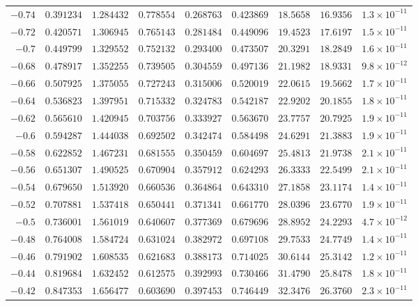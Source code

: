 \documentclass[12pt]{extarticle}
\theoremstyle{plain}
\theoremstyle{remark}
\begin{document}
{\begin{longtable}{rcccccccc}
$-0.74$ & $0.391234$ & $1.284432$ & $0.778554$ & $0.268763$ & $0.423869$ & $18.5658$ & $16.9356$ & $1.3\times10^{-11}$ \\
$-0.72$ & $0.420571$ & $1.306945$ & $0.765143$ & $0.281484$ & $0.449096$ & $19.4523$ & $17.6197$ & $1.5\times10^{-11}$ \\
$-0.7$ & $0.449799$ & $1.329552$ & $0.752132$ & $0.293400$ & $0.473507$ & $20.3291$ & $18.2849$ & $1.6\times10^{-11}$ \\
$-0.68$ & $0.478917$ & $1.352255$ & $0.739505$ & $0.304559$ & $0.497136$ & $21.1982$ & $18.9331$ & $9.8\times10^{-12}$ \\
$-0.66$ & $0.507925$ & $1.375055$ & $0.727243$ & $0.315006$ & $0.520019$ & $22.0615$ & $19.5662$ & $1.7\times10^{-11}$ \\
$-0.64$ & $0.536823$ & $1.397951$ & $0.715332$ & $0.324783$ & $0.542187$ & $22.9202$ & $20.1855$ & $1.8\times10^{-11}$ \\
$-0.62$ & $0.565610$ & $1.420945$ & $0.703756$ & $0.333927$ & $0.563670$ & $23.7757$ & $20.7925$ & $1.9\times10^{-11}$ \\
$-0.6$ & $0.594287$ & $1.444038$ & $0.692502$ & $0.342474$ & $0.584498$ & $24.6291$ & $21.3883$ & $1.9\times10^{-11}$ \\
$-0.58$ & $0.622852$ & $1.467231$ & $0.681555$ & $0.350459$ & $0.604697$ & $25.4813$ & $21.9738$ & $2.1\times10^{-11}$ \\
$-0.56$ & $0.651307$ & $1.490525$ & $0.670904$ & $0.357912$ & $0.624293$ & $26.3333$ & $22.5499$ & $2.1\times10^{-11}$ \\
$-0.54$ & $0.679650$ & $1.513920$ & $0.660536$ & $0.364864$ & $0.643310$ & $27.1858$ & $23.1174$ & $1.4\times10^{-11}$ \\
$-0.52$ & $0.707881$ & $1.537418$ & $0.650441$ & $0.371341$ & $0.661770$ & $28.0396$ & $23.6770$ & $1.9\times10^{-11}$ \\
$-0.5$ & $0.736001$ & $1.561019$ & $0.640607$ & $0.377369$ & $0.679696$ & $28.8952$ & $24.2293$ & $4.7\times10^{-12}$ \\
$-0.48$ & $0.764008$ & $1.584724$ & $0.631024$ & $0.382972$ & $0.697108$ & $29.7533$ & $24.7749$ & $1.4\times10^{-11}$ \\
$-0.46$ & $0.791902$ & $1.608535$ & $0.621683$ & $0.388173$ & $0.714025$ & $30.6144$ & $25.3142$ & $1.2\times10^{-11}$ \\
$-0.44$ & $0.819684$ & $1.632452$ & $0.612575$ & $0.392993$ & $0.730466$ & $31.4790$ & $25.8478$ & $1.8\times10^{-11}$ \\
$-0.42$ & $0.847353$ & $1.656477$ & $0.603690$ & $0.397453$ & $0.746449$ & $32.3476$ & $26.3760$ & $2.3\times10^{-11}$ \\

\end{longtable}}
\end{document}
